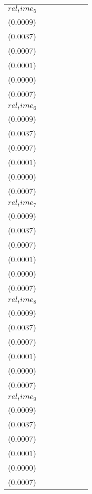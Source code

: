 \begin{tabular}{lllllll}
$rel_time_5$ & \makecell{$0.0030^{***}$ \\ ($0.0009$)} & \makecell{$0.0131^{***}$ \\ ($0.0037$)} & \makecell{$-0.0007^{}$ \\ ($0.0007$)} & \makecell{$-0.0000^{}$ \\ ($0.0001$)} & \makecell{$-0.0001^{***}$ \\ ($0.0000$)} & \makecell{$0.0023^{***}$ \\ ($0.0007$)} \\
$rel_time_6$ & \makecell{$0.0039^{***}$ \\ ($0.0009$)} & \makecell{$0.0180^{***}$ \\ ($0.0037$)} & \makecell{$-0.0024^{***}$ \\ ($0.0007$)} & \makecell{$-0.0002^{**}$ \\ ($0.0001$)} & \makecell{$-0.0001^{***}$ \\ ($0.0000$)} & \makecell{$0.0027^{***}$ \\ ($0.0007$)} \\
$rel_time_7$ & \makecell{$0.0034^{***}$ \\ ($0.0009$)} & \makecell{$0.0145^{***}$ \\ ($0.0037$)} & \makecell{$-0.0026^{***}$ \\ ($0.0007$)} & \makecell{$-0.0001^{*}$ \\ ($0.0001$)} & \makecell{$-0.0001^{***}$ \\ ($0.0000$)} & \makecell{$0.0025^{***}$ \\ ($0.0007$)} \\
$rel_time_8$ & \makecell{$0.0040^{***}$ \\ ($0.0009$)} & \makecell{$0.0146^{***}$ \\ ($0.0037$)} & \makecell{$-0.0008^{}$ \\ ($0.0007$)} & \makecell{$-0.0000^{}$ \\ ($0.0001$)} & \makecell{$-0.0000^{}$ \\ ($0.0000$)} & \makecell{$0.0031^{***}$ \\ ($0.0007$)} \\
$rel_time_9$ & \makecell{$0.0052^{***}$ \\ ($0.0009$)} & \makecell{$0.0216^{***}$ \\ ($0.0037$)} & \makecell{$-0.0008^{}$ \\ ($0.0007$)} & \makecell{$-0.0000^{}$ \\ ($0.0001$)} & \makecell{$-0.0000^{}$ \\ ($0.0000$)} & \makecell{$0.0043^{***}$ \\ ($0.0007$)} \\

\end{tabular}
